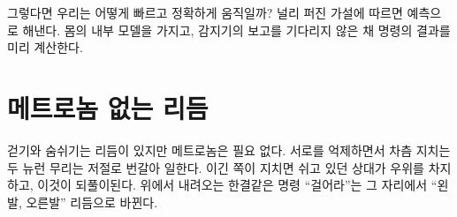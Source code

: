 그렇다면 우리는 어떻게 빠르고 정확하게 움직일까? 널리 퍼진 가설에 따르면 예측으로 해낸다. 몸의 내부 모델을 가지고, 감지기의 보고를 기다리지 않은 채 명령의 결과를 미리 계산한다.

\section*{메트로놈 없는 리듬}

걷기와 숨쉬기는 리듬이 있지만 메트로놈은 필요 없다. 서로를 억제하면서 차츰 지치는 두 뉴런 무리는 저절로 번갈아 일한다. 이긴 쪽이 지치면 쉬고 있던 상대가 우위를 차지하고, 이것이 되풀이된다. 위에서 내려오는 한결같은 명령 “걸어라”는 그 자리에서 “왼발, 오른발” 리듬으로 바뀐다.

